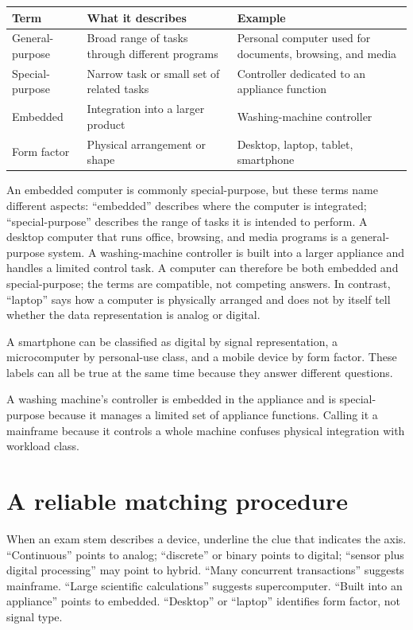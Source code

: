 \begin{center}
\begin{tabular}{p{}p{}p{}}
\toprule
\textbf{Term} & \textbf{What it describes} & \textbf{Example}\\
\midrule
General-purpose & Broad range of tasks through different programs & Personal computer used for documents, browsing, and media\\
Special-purpose & Narrow task or small set of related tasks & Controller dedicated to an appliance function\\
Embedded & Integration into a larger product & Washing-machine controller\\
Form factor & Physical arrangement or shape & Desktop, laptop, tablet, smartphone\\
\bottomrule
\end{tabular}
\end{center}

An embedded computer is commonly special-purpose, but these terms name
different aspects: ``embedded'' describes where the computer is integrated;
``special-purpose'' describes the range of tasks it is intended to perform.
A desktop computer that runs office, browsing, and media programs is a
general-purpose system. A washing-machine controller is built into a larger
appliance and handles a limited control task. A computer can therefore be
both embedded and special-purpose; the terms are compatible, not competing
answers. In contrast, ``laptop'' says how a computer is physically arranged
and does not by itself tell whether the data representation is analog or
digital.

\begin{example}
A smartphone can be classified as digital by signal representation, a
microcomputer by personal-use class, and a mobile device by form factor.
These labels can all be true at the same time because they answer different
questions.
\end{example}

\begin{example}
A washing machine's controller is embedded in the appliance and is
special-purpose because it manages a limited set of appliance functions.
Calling it a mainframe because it controls a whole machine confuses physical
integration with workload class.
\end{example}

\section{A reliable matching procedure}
When an exam stem describes a device, underline the clue that indicates the
axis. ``Continuous'' points to analog; ``discrete'' or binary points to
digital; ``sensor plus digital processing'' may point to hybrid. ``Many
concurrent transactions'' suggests mainframe. ``Large scientific
calculations'' suggests supercomputer. ``Built into an appliance'' points to
embedded. ``Desktop'' or ``laptop'' identifies form factor, not signal type.

